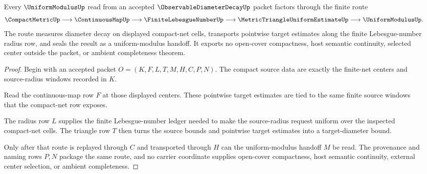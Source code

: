 \begin{theorem}
\label{thm:observable-diameter-decay-compact-uniform-route}
Every $\UniformModulusUp$ read from an accepted $\ObservableDiameterDecayUp$ packet factors through the finite route
$$
\CompactMetricUp \longrightarrow \ContinuousMapUp \longrightarrow \FiniteLebesgueNumberUp \longrightarrow \MetricTriangleUniformEstimateUp \longrightarrow \UniformModulusUp .
$$
The route measures diameter decay on displayed compact-net cells, transports pointwise target estimates along the finite Lebesgue-number radius row, and seals the result as a uniform-modulus handoff. It exports no open-cover compactness, host semantic continuity, selected center outside the packet, or ambient completeness theorem.
\end{theorem}
\begin{proof}
Begin with an accepted packet $O=(K,F,L,T,M,H,C,P,N)$. The compact source data are exactly the finite-net centers and source-radius windows recorded in $K$.

Read the continuous-map row $F$ at those displayed centers. These pointwise target estimates are tied to the same finite source windows that the compact-net row exposes.

The radius row $L$ supplies the finite Lebesgue-number ledger needed to make the source-radius request uniform over the inspected compact-net cells. The triangle row $T$ then turns the source bounds and pointwise target estimates into a target-diameter bound.

Only after that route is replayed through $C$ and transported through $H$ can the uniform-modulus handoff $M$ be read. The provenance and naming rows $P,N$ package the same route, and no carrier coordinate supplies open-cover compactness, host semantic continuity, external center selection, or ambient completeness.
\end{proof}




